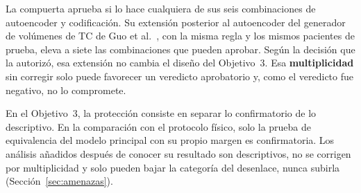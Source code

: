 La compuerta aprueba si lo hace cualquiera de sus seis combinaciones de autoencoder y codificación. Su extensión posterior al autoencoder del generador de volúmenes de TC de Guo et al.~\cite{guo2025maisi}, con la misma regla y los mismos pacientes de prueba, eleva a siete las combinaciones que pueden aprobar. Según la decisión que la autorizó, esa extensión no cambia el diseño del Objetivo~3. Esa \textbf{multiplicidad} sin corregir solo puede favorecer un veredicto aprobatorio y, como el veredicto fue negativo, no lo compromete.

En el Objetivo~3, la protección consiste en separar lo confirmatorio de lo descriptivo. En la comparación con el protocolo físico, solo la prueba de equivalencia del modelo principal con su propio margen es confirmatoria. Los análisis añadidos después de conocer su resultado son descriptivos, no se corrigen por multiplicidad y solo pueden bajar la categoría del desenlace, nunca subirla (Sección~\ref{sec:amenazas}).
